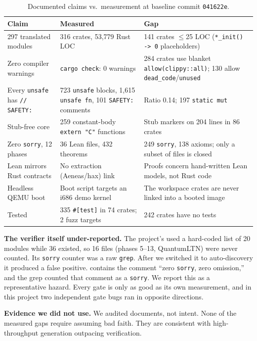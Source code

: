\documentclass[sigconf,nonacm]{acmart}
\begin{document}
\begin{table}[t]
\caption{Documented claims vs.\ measurement at baseline commit \texttt{041622e}.}
\label{tab:claims}
\small
\begin{tabular}{p{4.6cm}p{6.8cm}p{5.2cm}}
\toprule
\textbf{Claim} & \textbf{Measured} & \textbf{Gap} \\
\midrule
297 translated modules & 316 crates, 53{,}779 Rust LOC & 141 crates $\le$25 LOC (\texttt{*\_init() -> 0} placeholders) \\
Zero compiler warnings & \texttt{cargo check}: 0 warnings & 284 crates use blanket \texttt{allow(clippy::all)}; 130 allow \texttt{dead\_code}/\texttt{unused} \\
Every \texttt{unsafe} has \texttt{// SAFETY:} & 723 \texttt{unsafe} blocks, 1{,}615 \texttt{unsafe fn}, 101 \texttt{SAFETY:} comments & Ratio 0.14; 197 \texttt{static mut} \\
Stub-free core & 259 constant-body \texttt{extern "C"} functions & Stub markers on 204 lines in 86 crates \\
Zero \texttt{sorry}, 12 phases & 36 Lean files, 432 theorems & 249 \texttt{sorry}, 138 axioms; only a subset of files is closed \\
Lean mirrors Rust contracts & No extraction (Aeneas/hax) link & Proofs concern hand-written Lean models, not Rust code \\
Headless QEMU boot & Boot script targets an i686 demo kernel & The workspace crates are never linked into a booted image \\
Tested & 335 \texttt{\#[test]} in 74 crates; 2 fuzz targets & 242 crates have no tests \\
\bottomrule
\end{tabular}
\end{table}

\textbf{The verifier itself under-reported.} The project's  used a hard-coded list of 20 modules while 36 existed, so 16 files (phases 5--13, QuantumLTN) were never counted. Its \texttt{sorry} counter was a raw \texttt{grep}. After we switched it to auto-discovery it produced a false positive.  contains the comment ``zero \texttt{sorry}, zero omission,'' and the grep counted that comment as a \texttt{sorry}. We report this as a representative hazard. Every gate is only as good as its own measurement, and in this project two independent gate bugs ran in opposite directions.

\textbf{Evidence we did not use.} We audited documents, not intent. None of the measured gaps require assuming bad faith. They are consistent with high-throughput generation outpacing verification.
\end{document}
